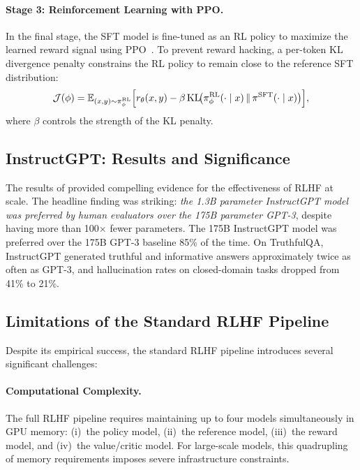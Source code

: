 \documentclass[12pt,a4paper]{report}
\theoremstyle{definition}
\begin{document}
\paragraph{Stage 3: Reinforcement Learning with PPO.}
In the final stage, the SFT model is fine-tuned as an RL policy to maximize the learned reward signal using PPO~\cite{schulman2017ppo}. To prevent reward hacking, a per-token KL divergence penalty constrains the RL policy to remain close to the reference SFT distribution:
\begin{equation}
    \mathcal{J}(\phi) = \mathbb{E}_{(x, y) \sim \pi_\phi^{\text{RL}}} \Bigl[r_\theta(x, y) - \beta \, \text{KL}\!\bigl(\pi_\phi^{\text{RL}}(\cdot \mid x) \,\|\, \pi^{\text{SFT}}(\cdot \mid x)\bigr)\Bigr],
    \label{eq:rlhf_objective}
\end{equation}
where $\beta$ controls the strength of the KL penalty.

\subsection{InstructGPT: Results and Significance}

The results of \cite{ouyang2022instructgpt} provided compelling evidence for the effectiveness of RLHF at scale. The headline finding was striking: \emph{the 1.3B parameter InstructGPT model was preferred by human evaluators over the 175B parameter GPT-3}, despite having more than 100$\times$ fewer parameters. The 175B InstructGPT model was preferred over the 175B GPT-3 baseline 85\% of the time. On TruthfulQA, InstructGPT generated truthful and informative answers approximately twice as often as GPT-3, and hallucination rates on closed-domain tasks dropped from 41\% to 21\%.

\subsection{Limitations of the Standard RLHF Pipeline}

Despite its empirical success, the standard RLHF pipeline introduces several significant challenges:

\paragraph{Computational Complexity.}
The full RLHF pipeline requires maintaining up to four models simultaneously in GPU memory: (i)~the policy model, (ii)~the reference model, (iii)~the reward model, and (iv)~the value/critic model. For large-scale models, this quadrupling of memory requirements imposes severe infrastructure constraints.
\end{document}
